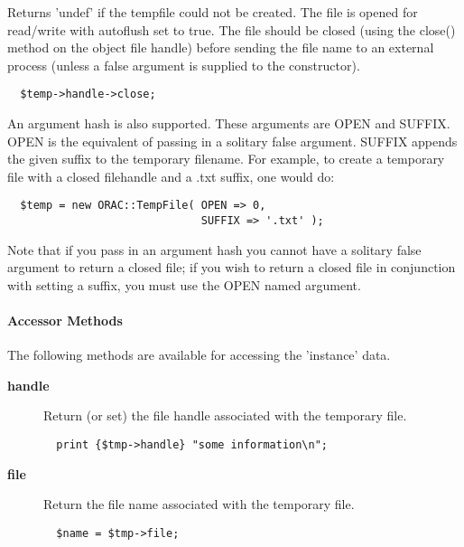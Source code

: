 \begin{description}
\begin{description}
\begin{description}
Returns 'undef' if the tempfile could not be created.
The file is opened for read/write with autoflush set to true.
The file should be closed (using the close() method on the
object file handle) before sending the file name to an external
process (unless a false argument is supplied to the constructor).

\begin{verbatim}
  $temp->handle->close;
\end{verbatim}


An argument hash is also supported. These arguments are OPEN and
SUFFIX. OPEN is the equivalent of passing in a solitary false
argument. SUFFIX appends the given suffix to the temporary
filename. For example, to create a temporary file with a closed
filehandle and a .txt suffix, one would do:

\begin{verbatim}
  $temp = new ORAC::TempFile( OPEN => 0,
                              SUFFIX => '.txt' );
\end{verbatim}


Note that if you pass in an argument hash you cannot have a solitary
false argument to return a closed file; if you wish to return a closed
file in conjunction with setting a suffix, you must use the OPEN named
argument.

\end{description}
\paragraph*{Accessor Methods\label{ORAC::TempFile_Accessor_Methods}}


The following methods are available for accessing the
'instance' data.

\begin{description}

\item[{\textbf{handle}}] \mbox{}

Return (or set) the file handle associated with the temporary
file.

\begin{verbatim}
  print {$tmp->handle} "some information\n";
\end{verbatim}

\item[{\textbf{file}}] \mbox{}

Return the file name associated with the temporary file.

\begin{verbatim}
  $name = $tmp->file;
\end{verbatim}



\end{description}
\end{description}
\end{description}
